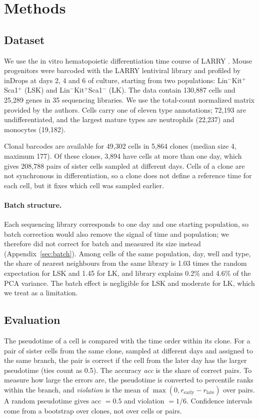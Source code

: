 \documentclass[10pt,a4paper,twocolumn]{article}
\begin{document}
\section{Methods}

\subsection{Dataset}
We use the in vitro hematopoietic differentiation time course of LARRY \cite{weinreb2020lineage}.
Mouse progenitors were barcoded with the LARRY lentiviral library and profiled by inDrops at
days 2, 4 and 6 of culture, starting from two populations: Lin$^-$Kit$^+$Sca1$^+$ (LSK) and
Lin$^-$Kit$^+$Sca1$^-$ (LK). The data contain 130{,}887 cells and 25{,}289 genes in 35 sequencing
libraries. We use the total-count normalized matrix provided by the authors. Cells carry one of
eleven type annotations; 72{,}193 are undifferentiated, and the largest mature types are
neutrophils (22{,}237) and monocytes (19{,}182).

Clonal barcodes are available for 49{,}302 cells in 5{,}864 clones (median size 4, maximum 177).
Of these clones, 3{,}894 have cells at more than one day, which gives 208{,}788 pairs of
sister cells sampled at different days. Cells of a clone are not synchronous in differentiation,
so a clone does not define a reference time for each cell, but it fixes which cell was sampled
earlier.

\paragraph{Batch structure.}
Each sequencing library corresponds to one day and one starting population, so batch correction
would also remove the signal of time and population; we therefore did not correct for batch and
measured its size instead (Appendix~\ref{sec:batch}). Among cells of the same population, day,
well and type, the share of nearest neighbours from the same library is 1.03 times the random
expectation for LSK and 1.45 for LK, and library explains 0.2\% and 4.6\% of the PCA variance.
The batch effect is negligible for LSK and moderate for LK, which we treat as a limitation.

\subsection{Evaluation}
The pseudotime of a cell is compared with the time order within its clone. For a pair of sister
cells from the same clone, sampled at different days and assigned to the same branch, the pair
is correct if the cell from the later day has the larger pseudotime (ties count as 0.5). The
accuracy \emph{acc} is the share of correct pairs. To measure how large the errors are, the
pseudotime is converted to percentile ranks within the branch, and \emph{violation} is the mean
of $\max(0, r_{\mathrm{early}} - r_{\mathrm{late}})$ over pairs. A random pseudotime gives
acc $=0.5$ and violation $=1/6$. Confidence intervals come from a bootstrap over clones, not over
cells or pairs.
\end{document}
